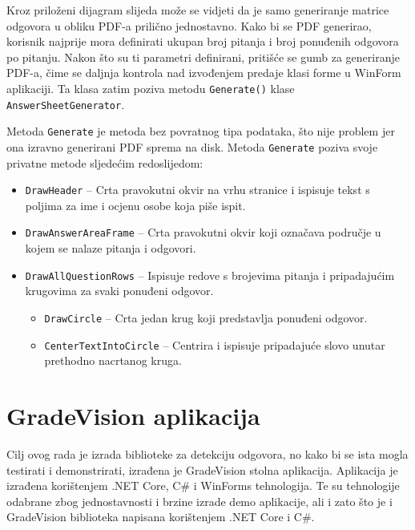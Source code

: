 \documentclass{foi}
\begin{document}
Kroz priloženi dijagram slijeda može se vidjeti da je samo generiranje matrice odgovora u obliku PDF-a prilično jednostavno. Kako bi se PDF generirao, korisnik najprije mora definirati ukupan broj pitanja i broj ponuđenih odgovora po pitanju. Nakon što su ti parametri definirani, pritišće se gumb za generiranje PDF-a, čime se daljnja kontrola nad izvođenjem predaje klasi forme u WinForm aplikaciji. Ta klasa zatim poziva metodu \texttt{Generate()} klase \texttt{AnswerSheetGenerator}. 

Metoda \texttt{Generate} je metoda bez povratnog tipa podataka, što nije problem jer ona izravno generirani PDF sprema na disk. Metoda \texttt{Generate} poziva svoje privatne metode sljedećim redoslijedom:

\begin{itemize}
\item \texttt{DrawHeader} – Crta pravokutni okvir na vrhu stranice i ispisuje tekst s poljima za ime i ocjenu osobe koja piše ispit.
\item \texttt{DrawAnswerAreaFrame} – Crta pravokutni okvir koji označava područje u kojem se nalaze pitanja i odgovori.
\item \texttt{DrawAllQuestionRows} – Ispisuje redove s brojevima pitanja i pripadajućim krugovima za svaki ponuđeni odgovor.
    \begin{itemize}
    \item \texttt{DrawCircle} – Crta jedan krug koji predstavlja ponuđeni odgovor.
    \item \texttt{CenterTextIntoCircle} – Centrira i ispisuje pripadajuće slovo unutar prethodno nacrtanog kruga.
    \end{itemize}
\end{itemize}


\section{GradeVision aplikacija}

Cilj ovog rada je izrada biblioteke za detekciju odgovora, no kako bi se ista mogla testirati i demonstrirati, izrađena je GradeVision stolna aplikacija. Aplikacija je izrađena korištenjem .NET Core, C\# i WinForms tehnologija. Te su tehnologije odabrane zbog jednostavnosti i brzine izrade demo aplikacije, ali i zato što je i GradeVision biblioteka napisana korištenjem .NET Core i C\#.
\end{document}
